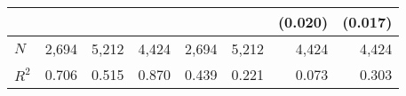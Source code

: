 \begin{tabular}{lrrrrrrr}
                         &                              &                            &                              &                              &                            &                                             (0.020) &                                             (0.017) \\ 
\midrule
$N$                      &                        2,694 &                      5,212 &                        4,424 &                        2,694 &                      5,212 &                                               4,424 &                                               4,424 \\ 
$R^2$                    &                        0.706 &                      0.515 &                        0.870 &                        0.439 &                      0.221 &                                               0.073 &                                               0.303 \\ 
\bottomrule
\end{tabular}

